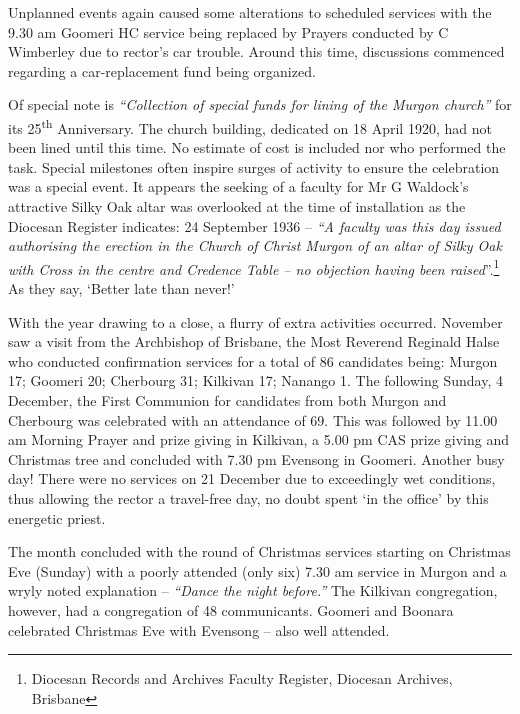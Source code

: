 Unplanned events again caused some alterations to scheduled services with the 9.30 am Goomeri HC service being replaced by Prayers conducted by C Wimberley due to rector's car trouble. Around this time, discussions commenced regarding a car-replacement fund being organized.



Of special note is \emph{``Collection of special funds for lining of the Murgon church''} for its 25\textsuperscript{th} Anniversary. The church building, dedicated on 18 April 1920, had not been lined until this time. No estimate of cost is included nor who performed the task. Special milestones often inspire surges of activity to ensure the celebration was a special event. It appears the seeking of a faculty for Mr G Waldock's attractive Silky Oak altar was overlooked at the time of installation as the Diocesan Register indicates: 24 September 1936 -- \emph{``A faculty was this day issued authorising the erection in the Church of Christ Murgon of an altar of Silky Oak with Cross in the centre and Credence Table -- no objection having been raised}''.\footnote{Diocesan Records and Archives Faculty Register, Diocesan Archives, Brisbane} As they say, `Better late than never!'


With the year drawing to a close, a flurry of extra activities occurred. November saw a visit from the Archbishop of Brisbane, the Most Reverend Reginald Halse who conducted confirmation services for a total of 86 candidates being: Murgon 17; Goomeri 20; Cherbourg 31; Kilkivan 17; Nanango 1. The following Sunday, 4 December, the First Communion for candidates from both Murgon and Cherbourg was celebrated with an attendance of 69. This was followed by 11.00 am Morning Prayer and prize giving in Kilkivan, a 5.00 pm CAS prize giving and Christmas tree and concluded with 7.30 pm Evensong in Goomeri. Another busy day! There were no services on 21 December due to exceedingly wet conditions, thus allowing the rector a travel-free day, no doubt spent `in the office' by this energetic priest.



The month concluded with the round of Christmas services starting on Christmas Eve (Sunday) with a poorly attended (only six) 7.30 am service in Murgon and a wryly noted explanation -- \emph{``Dance the night before.''} The Kilkivan congregation, however, had a congregation of 48 communicants. Goomeri and Boonara celebrated Christmas Eve with Evensong -- also well attended.



